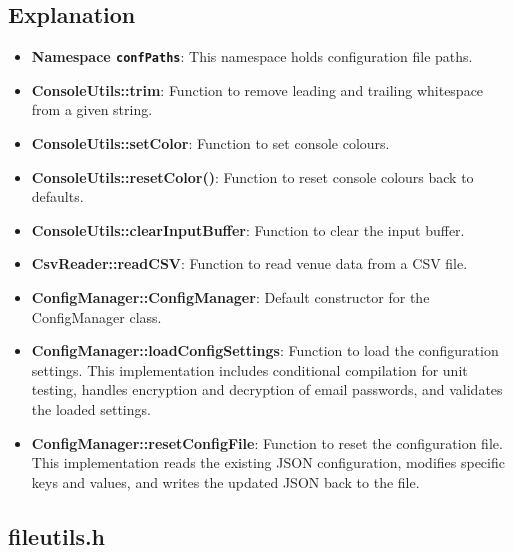 \documentclass{article}
\begin{document}
	\subsection*{Explanation}
	\begin{itemize}
		\item \textbf{Namespace \texttt{confPaths}}: This namespace holds configuration file paths.
		\item \textbf{ConsoleUtils::trim}: Function to remove leading and trailing whitespace from a given string.
		\item \textbf{ConsoleUtils::setColor}: Function to set console colours.
		\item \textbf{ConsoleUtils::resetColor()}: Function to reset console colours back to defaults.
		\item \textbf{ConsoleUtils::clearInputBuffer}: Function to clear the input buffer.
		\item \textbf{CsvReader::readCSV}: Function to read venue data from a CSV file.
		\item \textbf{ConfigManager::ConfigManager}: Default constructor for the ConfigManager class.
		\item \textbf{ConfigManager::loadConfigSettings}: Function to load the configuration settings. This implementation includes conditional compilation for unit testing, handles encryption and decryption of email passwords, and validates the loaded settings.
		\item \textbf{ConfigManager::resetConfigFile}: Function to reset the configuration file. This implementation reads the existing JSON configuration, modifies specific keys and values, and writes the updated JSON back to the file.
	\end{itemize}
	
	\subsection{fileutils.h}
	
\end{document}
